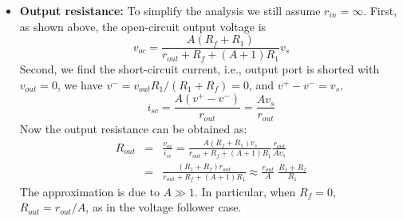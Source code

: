 \documentclass{article}
\begin{document}
\begin{itemize}
    \item {\bf Output resistance:} 
      To simplify the analysis we still assume $r_{in}=\infty$. First, as shown above, 
      the open-circuit output voltage is 
      \begin{equation} 
      v_{oc}=\frac{A(R_f+R_1)}{r_{out}+R_f+(A+1)R_1}v_s 
      \end{equation}
      Second, we find the short-circuit current, i.e., output port is shorted with
      $v_{out}=0$, we have $v^-=v_{out}R_1/(R_1+R_f)=0$, and $v^+-v^-=v_s$,
      \begin{equation} 
      i_{sc}=\frac{A(v^+-v^-)}{r_{out}}=\frac{Av_s}{r_{out}} 
      \end{equation}
      Now the output resistance can be obtained as:
      \begin{eqnarray}
        R_{out}&=&\frac{v_{oc}}{i_{sc}}=\frac{A(R_f+R_1)v_s}{r_{out}+R_f+(A+1)R_1} 
        \frac{r_{out}}{Av_s}
        \nonumber\\
        &=&\frac{(R_1+R_f)r_{out}}{r_{out}+R_f+(A+1)R_1}
        \approx \frac{r_{out}}{A}\;\frac{R_1+R_f}{R_1} 
        \nonumber
      \end{eqnarray}
      The approximation is due to $A\gg 1$. In particular, when $R_f=0$, 
      $R_{out}=r_{out}/A$, as in the voltage follower case.

  \end{itemize}
\end{document}
